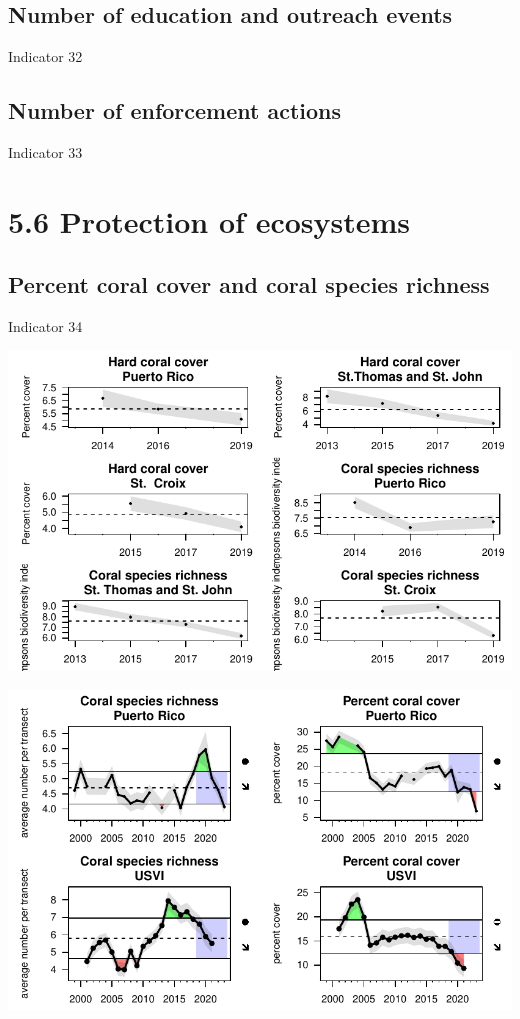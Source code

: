 \documentclass[
  letterpaper,
  oneside,
  open=any]{scrbook}
\begin{document}
\subsection{Number of education and outreach
events}\label{number-of-education-and-outreach-events}

Indicator 32

\subsection{Number of enforcement
actions}\label{number-of-enforcement-actions}

Indicator 33

\section{5.6 Protection of ecosystems}\label{protection-of-ecosystems}

\subsection{Percent coral cover and coral species
richness}\label{percent-coral-cover-and-coral-species-richness}

Indicator 34

\includegraphics{Report_book_files/Performance_indicators_files/figure-pdf/unnamed-chunk-8-1.pdf}

\includegraphics{Report_book_files/Performance_indicators_files/figure-pdf/unnamed-chunk-9-1.pdf}
\end{document}

